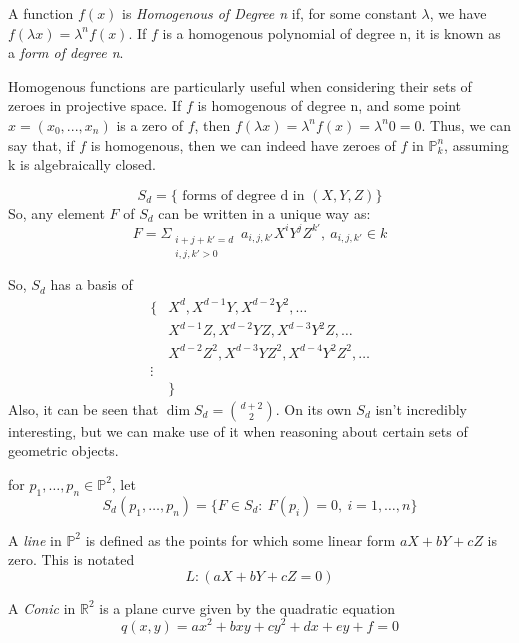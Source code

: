 \begin{mydef}
A function $f(x)$ is \emph{Homogenous of Degree n} if, for some 
constant $\lambda$, we have $f(\lambda x) = \lambda ^n f(x)$.
If $f$ is a homogenous polynomial of degree n, it is known as a \emph{form of degree n}.
\end{mydef}

Homogenous functions are particularly useful when considering their
sets of zeroes in projective space. If $f$ is homogenous of degree
n, and some point $x = (x_0, ..., x_n)$ is a zero of $f$, then
$f(\lambda x) = \lambda^n f(x) = \lambda^n 0 = 0$. Thus, we can say
that, if $f$ is homogenous, then we can indeed have zeroes of $f$ in $\mathbb{P}^n_k$,
assuming k is algebraically closed.

\begin{mydef}
\[
S_d = \{\text{ forms of degree d in $(X, Y, Z)$}\}
\]
So, any element $F$ of $S_d$ can be written in a unique way as:
\[
F = \Sigma _{\substack{i+j+k'=d \\ i,j,k' > 0}}~a_{i,j,k'} X^i Y^j Z^{k'},~a_{i,j,k'} \in k
\]
\end{mydef}
So, $S_d$ has a basis of 
\begin{align*}
\{&X^d, X^{d-1}Y, X^{d-2}Y^2, \dots\\
&X^{d-1}Z, X^{d-2}YZ, X^{d-3}Y^2Z, \dots\\
&X^{d-2}Z^2, X^{d-3}YZ^2, X^{d-4}Y^2Z^2, \dots\\
\vdots\\
&\}
\end{align*}
Also, it can be seen that $\dim S_d = {d+2 \choose 2}$. On its own
$S_d$ isn't incredibly interesting, but we can make use of it when
reasoning about certain sets of geometric objects.

\begin{mydef}
for $p_1, \dots, p_n \in \mathbb{P}^2$, let
\[
	S_d(p_1, \dots, p_n) = \{ F \in S_d :~F(p_i) = 0,~i=1,\dots,n\}
\]
\end{mydef}

\begin{mydef}
A \emph{line} in $\mathbb{P}^2$ is defined as the points for which
some linear form $aX + bY + cZ$ is zero. This is notated
\[
L:(aX+bY+cZ=0)
\]
\end{mydef}

\begin{mydef}
A \emph{Conic} in $\mathbb{R}^2$ is a plane curve given by the quadratic
equation
\[
q(x,y) = ax^2 + bxy + cy^2 + dx + ey + f = 0
\]
\end{mydef}

